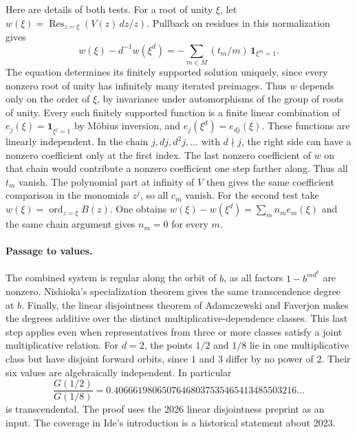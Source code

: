\documentclass[11pt,a4paper]{article}
\theoremstyle{definition}
\theoremstyle{remark}
\numberwithin{equation}{section}
\begin{document}
Here are details of both tests. For a root of unity $\xi$, let
$w(\xi)=\operatorname{Res}_{z=\xi}(V(z)\,dz/z)$. Pullback on residues in this normalization gives
\[
 w(\xi)-d^{-1}w(\xi^d)
 =-\sum_{m\in M}(t_m/m)\,\mathbf 1_{\xi^m=1}.
\]
The equation determines its finitely supported solution uniquely, since every nonzero root of unity has infinitely many iterated preimages. Thus $w$ depends only on the order of $\xi$, by invariance under automorphisms of the group of roots of unity. Every such finitely supported function is a finite linear combination of $e_j(\xi)=\mathbf 1_{\xi^j=1}$ by M\"obius inversion, and $e_j(\xi^d)=e_{dj}(\xi)$. These functions are linearly independent. In the chain $j,dj,d^2j,\ldots$ with $d\nmid j$, the right side can have a nonzero coefficient only at the first index. The last nonzero coefficient of $w$ on that chain would contribute a nonzero coefficient one step farther along. Thus all $t_m$ vanish. The polynomial part at infinity of $V$ then gives the same coefficient comparison in the monomials $z^j$, so all $c_m$ vanish. For the second test take $w(\xi)=\operatorname{ord}_{z=\xi}B(z)$. One obtains $w(\xi)-w(\xi^d)=\sum_m n_m e_m(\xi)$ and the same chain argument gives $n_m=0$ for every $m$.

\paragraph{Passage to values.}
The combined system is regular along the orbit of $b$, as all factors $1-b^{md^k}$ are nonzero. Nishioka's specialization theorem gives the same transcendence degree at $b$. Finally, the linear disjointness theorem of Adamczewski and Faverjon \cite[Theorem~1.1]{AFdisjoint} makes the degrees additive over the distinct multiplicative-dependence classes. This last step applies even when representatives from three or more classes satisfy a joint multiplicative relation. For $d=2$, the points $1/2$ and $1/8$ lie in one multiplicative class but have disjoint forward orbits, since $1$ and $3$ differ by no power of $2$. Their six values are algebraically independent.
In particular
\[
 \frac{G(1/2)}{G(1/8)}
  =0.40666198065076468037535465413485503216\ldots
\]
is transcendental. The proof uses the 2026 linear disjointness preprint as an input. The coverage in Ide's introduction is a historical statement about 2023.
\end{document}
